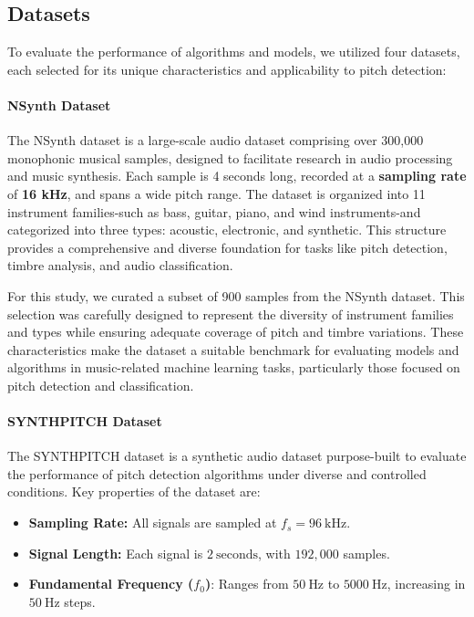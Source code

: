 \documentclass{ieeeaccess}
\begin{document}
\subsection{Datasets}

To evaluate the performance of algorithms and models, we utilized four datasets, each selected for its unique characteristics and applicability to pitch detection:

\paragraph{NSynth Dataset}
The NSynth dataset \cite{b9} is a large-scale audio dataset comprising over 300,000 monophonic musical samples, designed to facilitate research in audio processing and music synthesis. Each sample is 4 seconds long, recorded at a \textbf{sampling rate} of \textbf{16 kHz}, and spans a wide pitch range. The dataset is organized into 11 instrument families-such as bass, guitar, piano, and wind instruments-and categorized into three types: acoustic, electronic, and synthetic. This structure provides a comprehensive and diverse foundation for tasks like pitch detection, timbre analysis, and audio classification.

For this study, we curated a subset of 900 samples from the NSynth dataset. This selection was carefully designed to represent the diversity of instrument families and types while ensuring adequate coverage of pitch and timbre variations. These characteristics make the dataset a suitable benchmark for evaluating models and algorithms in music-related machine learning tasks, particularly those focused on pitch detection and classification.

\paragraph{SYNTHPITCH Dataset}
The SYNTHPITCH dataset \cite{b7} is a synthetic audio dataset purpose-built to evaluate the performance of pitch detection algorithms under diverse and controlled conditions. Key properties of the dataset are:
\begin{itemize}
    \item \textbf{Sampling Rate:} All signals are sampled at \( f_s = 96\ \text{kHz} \).
    \item \textbf{Signal Length:} Each signal is \( 2\ \text{seconds} \), with \( 192,000 \) samples.
    \item \textbf{Fundamental Frequency (\( f_0 \))}: Ranges from \( 50\ \text{Hz} \) to \( 5000\ \text{Hz} \), increasing in \( 50\ \text{Hz} \) steps.
\end{itemize}
\end{document}
